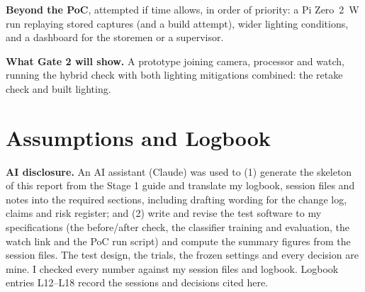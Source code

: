 \textbf{Beyond the PoC}, attempted if time allows, in order of priority:
a Pi Zero~2~W run replaying stored captures (and a build attempt), wider
lighting conditions, and a dashboard for the storemen or a supervisor.

\textbf{What Gate 2 will show.} A prototype joining camera, processor and
watch, running the hybrid check with both lighting mitigations combined:
the retake check and built lighting.

\section{Assumptions and Logbook}
\textbf{AI disclosure.} An AI assistant (Claude) was used to (1) generate
the skeleton of this report from the Stage 1 guide and translate my
logbook, session files and notes into the required sections, including
drafting wording for the change log, claims and risk register; and (2)
write and revise the test software to my specifications (the before/after
check, the classifier training and evaluation, the watch link and the PoC
run script) and compute the summary figures from the session files. The
test design, the trials, the frozen settings and every decision are mine.
I checked every number against my session files and logbook. Logbook
entries L12--L18 record the sessions and decisions cited here.



